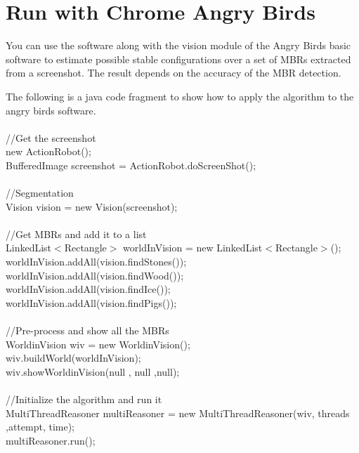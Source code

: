 \documentclass{article}
\begin{document}
\section{Run with Chrome Angry Birds} 
You can use the software along with the vision module of the Angry Birds basic software to estimate possible stable configurations over a set of MBRs extracted from a screenshot. The result depends on the accuracy of the MBR detection. 

The following is a java code fragment to show how to apply the algorithm to the angry birds software.
\\
\\//Get the screenshot
\\new ActionRobot();
\\BufferedImage screenshot = ActionRobot.doScreenShot();
\\
\\//Segmentation
\\Vision vision = new Vision(screenshot);
\\\\//Get MBRs and add it to a list
\\ LinkedList$<$Rectangle$>$ worldInVision = new LinkedList$<$Rectangle$>$(); 
\\worldInVision.addAll(vision.findStones());
\\worldInVision.addAll(vision.findWood());
\\ worldInVision.addAll(vision.findIce());
\\worldInVision.addAll(vision.findPigs());
\\
\\//Pre-process and show all the MBRs  
\\WorldinVision wiv = new WorldinVision();
\\wiv.buildWorld(worldInVision); 
\\wiv.showWorldinVision(null , null ,null);
\\
\\//Initialize the algorithm and run it	  
\\MultiThreadReasoner multiReasoner = new MultiThreadReasoner(wiv, threads ,attempt, time); 
\\multiReasoner.run();
\end{document}
